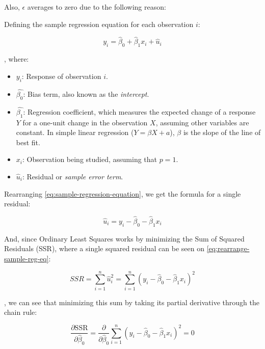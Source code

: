 \documentclass{article}
\theoremstyle{mytheoremstyle}
\theoremstyle{mytheoremstyle}
\theoremstyle{myproblemstyle}
\begin{document}
Also, \textbf{$\epsilon$} averages to zero due
to the following reason:

Defining the sample regression equation for each observation $i$:

\begin{equation}
	y_i = \hat{\beta}_0 + \hat{\beta}_1 x_i + \hat{u}_i
	\label{eq:sample-regression-equation}
\end{equation}

, where:

\begin{itemize}
	\item $y_i$: Response of observation $i$.
	\item $\hat{\beta_0}$: Bias term, also known as the \textit{intercept}.
	\item $\hat{\beta_1}$: Regression coefficient, which measures
	      the expected change of a response $Y$ for a one-unit
	      change in the observation $X$, assuming other variables
	      are constant. In simple linear regression ($Y = \beta X + a$),
	      $\beta$ is the slope of the line of best fit.
	\item $x_i$: Observation being studied, assuming that $p = 1$.
	\item $\hat{u}_i$: Residual or \textit{sample error term}.
\end{itemize}

Rearranging \eqref{eq:sample-regression-equation}, we get
the formula for a single residual:

\begin{equation}
	\hat{u}_i = y_i - \hat{\beta}_0 - \hat{\beta}_1 x_i
	\label{eq:rearrange-sample-reg-eq}
\end{equation}

And, since Ordinary Least Squares works by minimizing
the Sum of Squared Residuals (SSR),
where a single squared residual can
be seen on \eqref{eq:rearrange-sample-reg-eq}:

\begin{equation}
	\textit{SSR} = \sum_{i=1}^{n} \hat{u}_i ^ {2} = \sum_{i=1}^{n} (y_i - \hat{\beta}_0 - \hat{\beta}_1 x_i)^2
\end{equation}

, we can see that minimizing this sum
by taking its partial derivative
through the chain rule:

\begin{equation}
	\frac{\partial\text{SSR}}{\partial \hat{\beta}_0} = \frac{\partial}{\partial\hat{\beta}_0} \sum_{i=1}^{n} (y_i - \hat{\beta}_0 - \hat{\beta}_1 x_i)^2 = 0
\end{equation}
\end{document}
